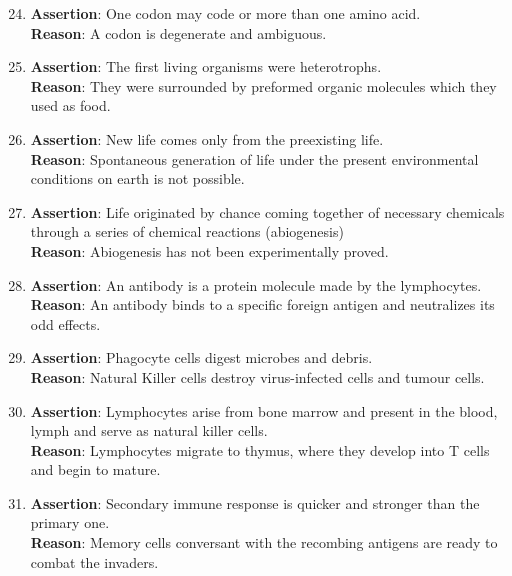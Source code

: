 \documentclass{article}
\begin{document}
\begin{enumerate}
    \setcounter{enumi}{23}
    \item \textbf{Assertion}: One codon may code or more than one amino acid. \\
    \textbf{Reason}: A codon is degenerate and ambiguous.

    \item \textbf{Assertion}: The first living organisms were heterotrophs. \\
    \textbf{Reason}: They were surrounded by preformed organic molecules which they used as food.

    \item \textbf{Assertion}: New life comes only from the preexisting life. \\
    \textbf{Reason}: Spontaneous generation of life under the present environmental conditions on earth is not possible.

    \item \textbf{Assertion}: Life originated by chance coming together of necessary chemicals through a series of chemical reactions (abiogenesis) \\
    \textbf{Reason}: Abiogenesis has not been experimentally proved.

    \item \textbf{Assertion}: An antibody is a protein molecule made by the lymphocytes. \\
    \textbf{Reason}: An antibody binds to a specific foreign antigen and neutralizes its odd effects.

    \item \textbf{Assertion}: Phagocyte cells digest microbes and debris. \\
    \textbf{Reason}: Natural Killer cells destroy virus-infected cells and tumour cells.

    \item \textbf{Assertion}: Lymphocytes arise from bone marrow and present in the blood, lymph and serve as natural killer cells. \\
    \textbf{Reason}: Lymphocytes migrate to thymus, where they develop into T cells and begin to mature.

    \item \textbf{Assertion}: Secondary immune response is quicker and stronger than the primary one. \\
    \textbf{Reason}: Memory cells conversant with the recombing antigens are ready to combat the invaders.


\end{enumerate}
\end{document}
